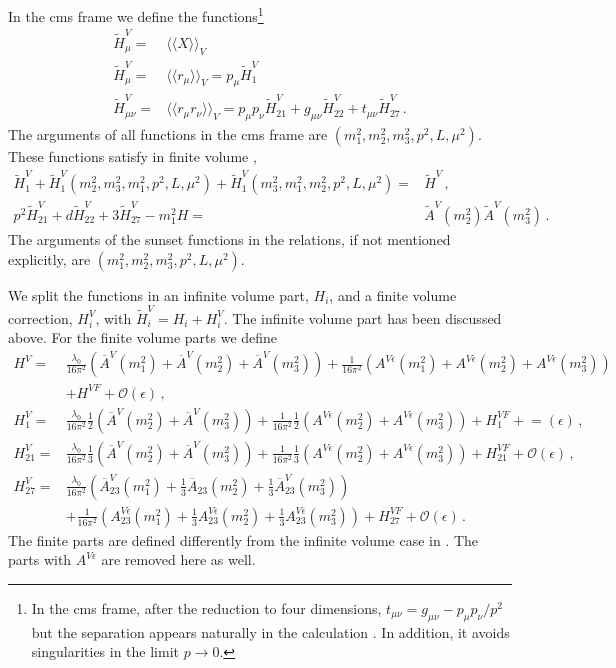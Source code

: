 \documentclass[12pt,a4paper]{article}
\begin{document}
In the cms frame we define the functions\footnote{In the cms frame,
after the reduction to four dimensions,
$t_{\mu\nu}= g_{\mu\nu}-p_\mu p_\nu/p^2$ but the separation
appears naturally in the calculation \cite{Bijnens:2013doa}. In addition, it
avoids singularities in the limit $p\to0$.}
\begin{align}
\label{defHi}
\tilde H^V_\mu =& \langle\langle X \rangle\rangle_V
\\\nonumber
\tilde H^V_\mu =& \langle\langle r_\mu \rangle\rangle_V = p_\mu \tilde H^V_1\,
\\\nonumber
\tilde H^V_{\mu\nu} =&  \langle\langle r_\mu r_\nu \rangle\rangle_V
=p_\mu p_\nu \tilde H^V_{21} + g_{\mu\nu} \tilde H^V_{22} + t_{\mu\nu} \tilde H^V_{27}\,.
\end{align}
The arguments of all functions in the cms frame are
$(m_1^2,m_2^2,m_3^2,p^2,L,\mu^2)$.
These functions satisfy in finite
volume \cite{Bijnens:2013doa},
\begin{align}
\label{Hrelations}
\tilde H^V_1+
\tilde H^V_1(m_2^2,m_3^2,m_1^2,p^2,L,\mu^2)+
\tilde H^V_1(m_3^2,m_1^2,m_2^2,p^2,L,\mu^2)
=& \tilde H^V\,,
\nonumber\\
p^2 \tilde H^V_{21}+d \tilde H^V_{22} + 3 \tilde H^V_{27}-m_1^2 H =&
\tilde A^V(m_2^2)\tilde A^V(m_3^2)\,.
\end{align}
The arguments of the sunset functions in the relations, if not mentioned
explicitly, are  $(m_1^2,m_2^2,m_3^2,p^2,L,\mu^2)$.

We split the functions in an infinite volume part, $H_i$, and a finite
volume correction, $H^V_i$, with
$\tilde H^V_i= H_i+ H^V_i$. The infinite volume part has been
discussed above.
For the finite volume parts we define
\begin{align}
\label{defHVF}
H^V =& \frac{\lambda_0}{16\pi^2}
 \left(\overline A^V(m_1^2)+\overline A^V(m_2^2)+\overline A^V(m_3^2)\right)
 +\frac{1}{16\pi^2}
    \left(A^{V\epsilon}(m_1^2)+A^{V\epsilon}(m_2^2)+A^{V\epsilon}(m_3^2)\right)
\nonumber\\&
 +H^{VF}+\mathcal{O}(\epsilon)\,,
\nonumber\\
H^V_1 =& \frac{\lambda_0}{16\pi^2}\frac{1}{2}
 \left(\overline A^V(m_2^2)+\overline A^V(m_3^2)\right)
 +\frac{1}{16\pi^2}\frac{1}{2}
    \left(A^{V\epsilon}(m_2^2)+A^{V\epsilon}(m_3^2)\right)
 +H^{VF}_1+\mathcal{=}(\epsilon)\,,
\nonumber\\
H^V_{21} =& \frac{\lambda_0}{16\pi^2}\frac{1}{3}
 \left(\overline A^V(m_2^2)+\overline A^V(m_3^2)\right)
 +\frac{1}{16\pi^2}\frac{1}{3}
    \left(A^{V\epsilon}(m_2^2)+A^{V\epsilon}(m_3^2)\right)
 +H^{VF}_{21}+\mathcal{O}(\epsilon)\,,
\nonumber\\
 H^V_{27} =& \frac{\lambda_0}{16\pi^2}
 \left(\overline A^V_{23}(m_1^2)+\frac{1}{3}\overline A_{23}(m_2^2)+
       \frac{1}{3}\overline A^V_{23}(m_3^2)\right)
\nonumber\\&
 +\frac{1}{16\pi^2}
    \left(A^{V\epsilon}_{23}(m_1^2)
+\frac{1}{3}A^{V\epsilon}_{23}(m_2^2)
+\frac{1}{3}A^{V\epsilon}_{23}(m_3^2)\right)
 +H^{VF}_{27}+\mathcal{O}(\epsilon)\,.
\end{align}
The finite parts are defined differently from the
infinite volume case in \cite{Amoros:1999dp}.
The parts with $A^{V\epsilon}$ are removed here as well.
\end{document}
